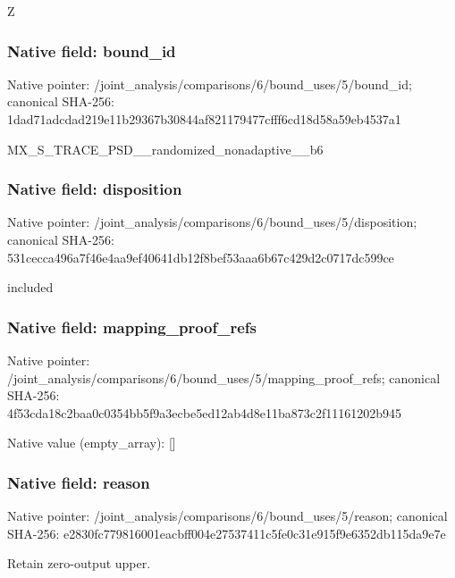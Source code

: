 \documentclass[10pt,a4paper]{article}
\begin{document}
\begingroup\raggedright\sloppy Z\par\endgroup

\subsubsection{Native field: bound\_\allowbreak{}id}
Native pointer: /joint\_\allowbreak{}analysis/comparisons/6/bound\_\allowbreak{}uses/5/bound\_\allowbreak{}id; canonical SHA-256: 1dad71adcdad219e11b29367b30844af821179477cfff6cd18d58a59eb4537a1

\begingroup\raggedright\sloppy MX\_\allowbreak{}S\_\allowbreak{}TRACE\_\allowbreak{}PSD\_\allowbreak{}\_\allowbreak{}randomized\_\allowbreak{}nonadaptive\_\allowbreak{}\_\allowbreak{}b6\par\endgroup

\subsubsection{Native field: disposition}
Native pointer: /joint\_\allowbreak{}analysis/comparisons/6/bound\_\allowbreak{}uses/5/disposition; canonical SHA-256: 531cecca496a7f46e4aa9ef40641db12f8bef53aaa6b67c429d2c0717dc599ce

\begingroup\raggedright\sloppy included\par\endgroup

\subsubsection{Native field: mapping\_\allowbreak{}proof\_\allowbreak{}refs}
Native pointer: /joint\_\allowbreak{}analysis/comparisons/6/bound\_\allowbreak{}uses/5/mapping\_\allowbreak{}proof\_\allowbreak{}refs; canonical SHA-256: 4f53cda18c2baa0c0354bb5f9a3ecbe5ed12ab4d8e11ba873c2f11161202b945

Native value (empty\_\allowbreak{}array): []

\subsubsection{Native field: reason}
Native pointer: /joint\_\allowbreak{}analysis/comparisons/6/bound\_\allowbreak{}uses/5/reason; canonical SHA-256: e2830fc779816001eacbff004e27537411c5fe0c31e915f9e6352db115da9e7e

\begingroup\raggedright\sloppy Retain zero-output upper.\par\endgroup
\end{document}

